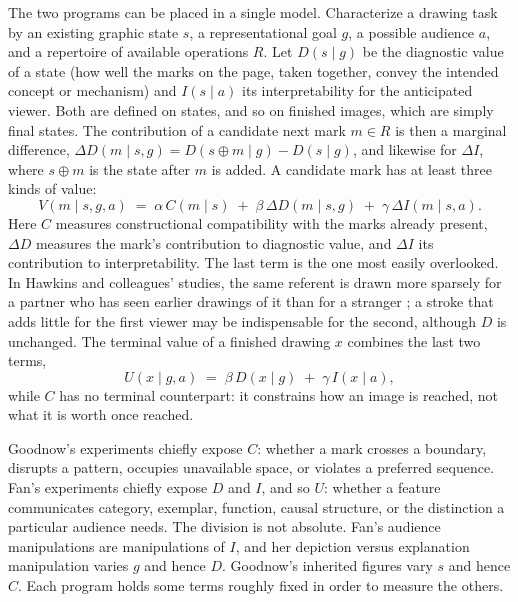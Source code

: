 \documentclass[11pt]{article}
\theoremstyle{remark}
\begin{document}
The two programs can be placed in a single model. Characterize a drawing task by an existing graphic state $s$, a representational goal $g$, a possible audience $a$, and a repertoire of available operations $R$. Let $D(s \mid g)$ be the diagnostic value of a state (how well the marks on the page, taken together, convey the intended concept or mechanism) and $I(s \mid a)$ its interpretability for the anticipated viewer. Both are defined on states, and so on finished images, which are simply final states. The contribution of a candidate next mark $m \in R$ is then a marginal difference, $\Delta D(m \mid s, g) = D(s \oplus m \mid g) - D(s \mid g)$, and likewise for $\Delta I$, where $s \oplus m$ is the state after $m$ is added. A candidate mark has at least three kinds of value:
\begin{equation}
\label{eq:value}
V(m \mid s, g, a) \;=\; \alpha\, C(m \mid s) \;+\; \beta\, \Delta D(m \mid s, g) \;+\; \gamma\, \Delta I(m \mid s, a).
\end{equation}
Here $C$ measures constructional compatibility with the marks already present, $\Delta D$ measures the mark's contribution to diagnostic value, and $\Delta I$ its contribution to interpretability. The last term is the one most easily overlooked. In Hawkins and colleagues' studies, the same referent is drawn more sparsely for a partner who has seen earlier drawings of it than for a stranger \cite{hawkins2023resemblance}; a stroke that adds little for the first viewer may be indispensable for the second, although $D$ is unchanged. The terminal value of a finished drawing $x$ combines the last two terms,
\[
U(x \mid g, a) \;=\; \beta\, D(x \mid g) \;+\; \gamma\, I(x \mid a),
\]
while $C$ has no terminal counterpart: it constrains how an image is reached, not what it is worth once reached.

Goodnow's experiments chiefly expose $C$: whether a mark crosses a boundary, disrupts a pattern, occupies unavailable space, or violates a preferred sequence. Fan's experiments chiefly expose $D$ and $I$, and so $U$: whether a feature communicates category, exemplar, function, causal structure, or the distinction a particular audience needs. The division is not absolute. Fan's audience manipulations are manipulations of $I$, and her depiction versus explanation manipulation varies $g$ and hence $D$. Goodnow's inherited figures vary $s$ and hence $C$. Each program holds some terms roughly fixed in order to measure the others.
\end{document}
